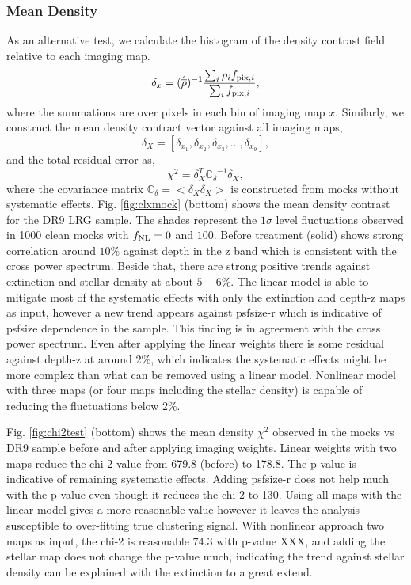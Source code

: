 \subsubsection{Mean Density}
As an alternative test, we calculate the histogram of the density contrast field relative to each imaging map.
\begin{equation}
\delta_{x} = ({\hat{\overline{\rho}}})^{-1} \frac{\sum_{i} \rho_{i} f_{{\rm pix}, i}}{\sum_{i} f_{{\rm pix}, i}},
\end{equation}
where the summations are over pixels in each bin of imaging map $x$. Similarly, we construct the mean density contract vector against all imaging maps,
\begin{equation}
\delta_{X} = [\delta_{x_{1}}, \delta_{x_{2}}, \delta_{x_{3}}, ..., \delta_{x_{9}}],
\end{equation}
and the total residual error as,
\begin{equation}
\chi^{2} = \delta_{X}^{T} \mathbb{C_{\delta}}^{-1} \delta_{X},
\end{equation}
where the covariance matrix $\mathbb{C}_{\delta} = < \delta_{X} \delta_{X}>$ is constructed from mocks without systematic effects. Fig. \ref{fig:clxmock} (bottom) shows the mean density contrast for the DR9 LRG sample. The shades represent the $1\sigma$ level fluctuations observed in 1000 clean mocks with $f_{\rm NL}=0$ and $100$. Before treatment (solid) shows strong correlation around $10\%$ against depth in the z band which is consistent with the cross power spectrum. Beside that, there are strong positive trends against extinction and stellar density at about $5-6\%$. The linear model is able to mitigate most of the systematic effects with only the extinction and depth-z maps as input, however a new trend appears against psfsize-r which is indicative of psfsize dependence in the sample. This finding is in agreement with the cross power spectrum. Even after applying the linear weights there is some residual against depth-z at around $2\%$, which indicates the systematic effects might be more complex than what can be removed using a linear model. Nonlinear model with three maps (or four maps including the stellar density) is capable of reducing the fluctuations below $2\%$. 

Fig. \ref{fig:chi2test} (bottom) shows the mean density $\chi^{2}$ observed in the mocks vs DR9 sample before and after applying imaging weights. Linear weights with two maps reduce the chi-2 value from 679.8 (before) to 178.8. The p-value is indicative of remaining systematic effects. Adding psfsize-r does not help much with the p-value even though it reduces the chi-2 to 130. Using all maps with the linear model gives a more reasonable value however it leaves the analysis susceptible to over-fitting true clustering signal. With nonlinear approach two maps as input, the chi-2 is reasonable 74.3 with p-value XXX, and adding the stellar map does not change the p-value much, indicating the trend against stellar density can be explained with the extinction to a great extend. 


